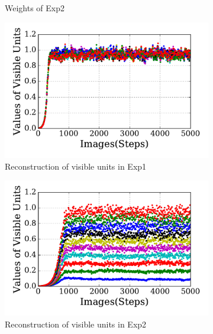 \begin{figure}
\begin{subfigure}[t]{0.48\textwidth}
		\caption{Weights of Exp2}
	\end{subfigure}
	\begin{subfigure}[t]{0.48\textwidth}
		\includegraphics[width=\textwidth]{pics_sdlm/31_exp_RBM_noise/exp1_recon_s.pdf}
		\caption{Reconstruction of visible units in Exp1}
	\end{subfigure}
	\begin{subfigure}[t]{0.48\textwidth}
		\includegraphics[width=\textwidth]{pics_sdlm/31_exp_RBM_noise/exp2_recon_s.pdf}
		\caption{Reconstruction of visible units in Exp2}
	\end{subfigure}\\
	\begin{subfigure}[t]{0.48\textwidth}

\end{subfigure}
\end{figure}
